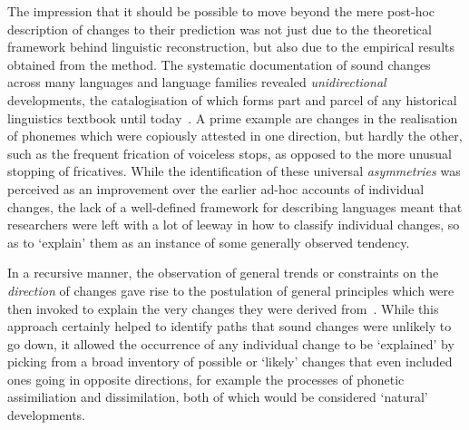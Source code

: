 The impression that it should be possible to move beyond the mere post-hoc description of changes to their prediction was not just due to the theoretical framework behind linguistic reconstruction, but also due to the empirical results obtained from the method. The systematic documentation of sound changes across many languages and language families revealed \emph{unidirectional} developments, the catalogisation of which forms part and parcel of any historical linguistics textbook until today~\citep[see e.g.][]{Campbell2013}. A prime example are changes in the realisation of phonemes which were copiously attested in one direction, but hardly the other, such as the frequent frication of voiceless stops, as opposed to the more unusual stopping of fricatives. While the identification of these universal \emph{asymmetries} was perceived as an improvement over the earlier ad-hoc accounts of individual changes, the lack of a well-defined framework for describing languages meant that researchers were left with a lot of leeway in how to classify individual changes, so as to `explain' them as an instance of some generally observed tendency.

In a recursive manner, the observation of general trends or constraints on the \emph{direction} of changes gave rise to the postulation of general principles which were then invoked to explain the very changes they were derived from~\citep{Lass1980,Haspelmath2006}. While this approach certainly helped to identify paths that sound changes were unlikely %
to go down, it allowed the occurrence of any individual change to be `explained' by picking from a broad inventory of possible or `likely' changes that even included ones going in opposite directions, for example the processes of phonetic assimiliation and dissimilation, both of which would be considered `natural' developments.

